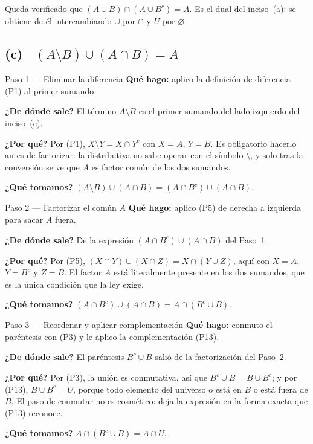 \documentclass[11pt]{article}
\begin{document}
\begin{resp}
Queda verificado que $(A\cup B)\cap(A\cup B^{c})=A$. Es el dual del inciso~(a): se obtiene de él
intercambiando $\cup$ por $\cap$ y $U$ por $\varnothing$.
\end{resp}

\subsection*{(c) \ $(A\setminus B)\cup(A\cap B)=A$}

\begin{paso}{Paso 1 --- Eliminar la diferencia}
\textbf{Qué hago:} aplico la definición de diferencia (P1) al primer sumando.

\textbf{¿De dónde sale?} El término $A\setminus B$ es el primer sumando del lado izquierdo del
inciso~(c).

\textbf{¿Por qué?} Por (P1), $X\setminus Y=X\cap Y^{c}$ con $X=A$, $Y=B$. Es obligatorio hacerlo
antes de factorizar: la distributiva no sabe operar con el símbolo $\setminus$, y solo tras la
conversión se ve que $A$ es factor común de los dos sumandos.

\textbf{¿Qué tomamos?} $(A\setminus B)\cup(A\cap B)=(A\cap B^{c})\cup(A\cap B)$.
\end{paso}

\begin{paso}{Paso 2 --- Factorizar el común $A$}
\textbf{Qué hago:} aplico (P5) de derecha a izquierda para sacar $A$ fuera.

\textbf{¿De dónde sale?} De la expresión $(A\cap B^{c})\cup(A\cap B)$ del Paso~1.

\textbf{¿Por qué?} Por (P5), $(X\cap Y)\cup(X\cap Z)=X\cap(Y\cup Z)$, aquí con $X=A$, $Y=B^{c}$
y $Z=B$. El factor $A$ está literalmente presente en los dos sumandos, que es la única condición
que la ley exige.

\textbf{¿Qué tomamos?} $(A\cap B^{c})\cup(A\cap B)=A\cap(B^{c}\cup B)$.
\end{paso}

\begin{paso}{Paso 3 --- Reordenar y aplicar complementación}
\textbf{Qué hago:} conmuto el paréntesis con (P3) y le aplico la complementación (P13).

\textbf{¿De dónde sale?} El paréntesis $B^{c}\cup B$ salió de la factorización del Paso~2.

\textbf{¿Por qué?} Por (P3), la unión es conmutativa, así que $B^{c}\cup B=B\cup B^{c}$; y por
(P13), $B\cup B^{c}=U$, porque todo elemento del universo o está en $B$ o está fuera de $B$. El
paso de conmutar no es cosmético: deja la expresión en la forma exacta que (P13) reconoce.

\textbf{¿Qué tomamos?} $A\cap(B^{c}\cup B)=A\cap U$.
\end{paso}
\end{document}
